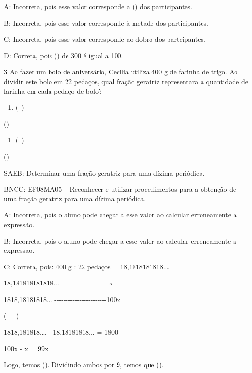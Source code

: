 A: Incorreta, pois esse valor corresponde a () dos
participantes.

B: Incorreta, pois esse valor corresponde à metade dos participantes.

C: Incorreta, pois esse valor corresponde ao dobro dos partcipantes.

D: Correta, pois () de 300 é igual a 100.

\num{3} Ao fazer um bolo de aniversário, Cecilia utiliza 400 g de farinha de
trigo. Ao dividir este bolo em 22 pedaços, qual fração geratriz
representara a quantidade de farinha em cada pedaço de bolo?

\begin{enumerate}
\def\labelenumi{\alph{enumi})}
\tightlist
\item
  (\ )
\end{enumerate}
\item ()

\begin{enumerate}
\def\labelenumi{\alph{enumi})}
\setcounter{enumi}{2}
\tightlist
\item
  (\ )
\end{enumerate}
\item ()

SAEB: Determinar uma fração geratriz para uma dízima periódica.

BNCC: EF08MA05 -- Reconhecer e utilizar procedimentos para a obtenção de
uma fração geratriz para uma dízima periódica.

A: Incorreta, pois o aluno pode chegar a esse valor ao calcular
erroneamente a expressão.

B: Incorreta, pois o aluno pode chegar a esse valor ao calcular
erroneamente a expressão.

C: Correta, pois: 400 g : 22 pedaços = 18,1818181818.\ldots{}

18,181818181818...
-\/-\/-\/-\/-\/-\/-\/-\/-\/-\/-\/-\/-\/-\/-\/-\/-\/-\/-\/- x

1818,18181818...
-\/-\/-\/-\/-\/-\/-\/-\/-\/-\/-\/-\/-\/-\/-\/-\/-\/-\/-\/-\/-\/-\/-100x

( = )

1818,181818.\ldots{} - 18,18181818... = 1800

100x - x = 99x

Logo, temos (). Dividindo ambos por 9, temos que
().

